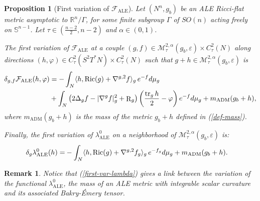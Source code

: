 \documentclass[a4paper,11pt,reqno]{amsart}
\newtheorem{prop}[defn]{Proposition}
\newtheorem{rk}[defn]{Remark}
\def\RR{\mathbb{R}}
\def\Ric{\mathop{\rm Ric}\nolimits}
\def\tr{\mathop{\rm tr}\nolimits}
\def\Ric{\mathop{\rm Ric}\nolimits}
\def\tr{\mathop{\rm tr}\nolimits}
\def\R{\mathop{\rm R}\nolimits}
\numberwithin{equation}{section}
\begin{document}
	\begin{prop}[First variation of $\mathcal{F}_{\operatorname{ALE}}$]\label{first-var-prop} Let $(N^n,g_b)$ be an ALE Ricci-flat metric asymptotic to $\RR^n\slash\Gamma$, for some finite subgroup $\Gamma$ of $SO(n)$ acting freely on $\mathbb{S}^{n-1}$. Let $\tau\in(\frac{n-2}{2},n-2)$ and $\alpha\in(0,1)$. 
		
		The first variation of $\mathcal{F}_{\operatorname{ALE}}$ at a couple $(g,f)\in  \mathcal{M}^{2,\alpha}_{\tau}(g_b,\varepsilon)\times C^{2}_{\tau}(N)$ along directions $(h,\varphi)\in C^{2}_{\tau}(S^2T^*N)\times C^{2}_{\tau}(N)$ such that $g+h\in \mathcal{M}^{2,\alpha}_{\tau}(g_b,\varepsilon)$ is
		\begin{equation}
		\begin{split}
		\delta_{g,f}\mathcal{F}_{\operatorname{ALE}}(h,\varphi)&=-\int_N\langle h,\Ric(g)+\nabla^{g,2}f\rangle_g\, e^{-f}d\mu_g\\
		&+\int_N\left(2\Delta_gf-|\nabla^gf|^2_g+\R_g\right)\left(\frac{\tr_gh}{2}-\varphi\right)e^{-f}d\mu_g+m_{\operatorname{ADM}}(g_b+h),
		\label{first-var-F}
		\end{split}
		\end{equation}
		where $m_{\operatorname{ADM}}(g_b+h)$ is the mass of the metric $g_b+h$ defined in (\ref{def-mass}). 
		
		Finally, the first variation of $\lambda_{\operatorname{ALE}}^0$ on a neighborhood of $\mathcal{M}^{2,\alpha}_{\tau}(g_b,\varepsilon)$ is:
		\begin{equation}
		\begin{split}
		\delta_g \lambda_{\operatorname{ALE}}^0(h)=&-\int_N\langle h,\Ric(g)+\nabla^{g,2}f_g\rangle_g \,e^{-f_g}d\mu_g+m_{\operatorname{ADM}}(g_b+h).\label{first-var-lambda}
		\end{split}
		\end{equation}
	\end{prop}
	\begin{rk}
		Notice that (\ref{first-var-lambda}) gives a link between the variation of the functional $\lambda_{\operatorname{ALE}}^0$, the mass of an ALE metric with integrable scalar curvature and its associated Bakry-\'Emery tensor.
	\end{rk}
\end{document}
